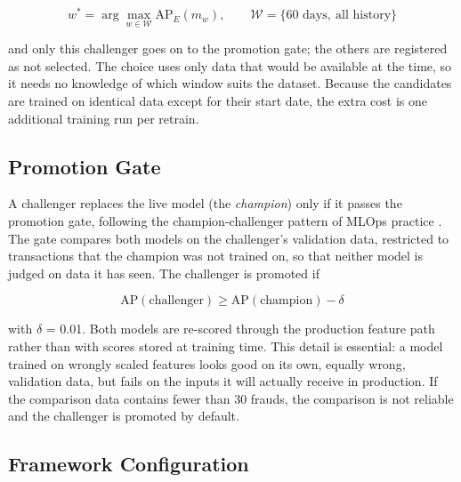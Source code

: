 \begin{equation}
  w^{*} = \arg\max_{w \in \mathcal{W}} \mathrm{AP}_{E}(m_w), \qquad \mathcal{W} = \{\text{60 days},\ \text{all history}\}
  \label{eq:select}
\end{equation}

and only this challenger goes on to the promotion gate; the others are registered as not selected. The choice uses only data that would be available at the time, so it needs no knowledge of which window suits the dataset. Because the candidates are trained on identical data except for their start date, the extra cost is one additional training run per retrain.

\subsection{Promotion Gate}\label{sec:gate}

A challenger replaces the live model (the \textit{champion}) only if it passes the promotion gate, following the champion-challenger pattern of MLOps practice \cite{pulicharla2019,kodakandla2024}. The gate compares both models on the challenger's validation data, restricted to transactions that the champion was not trained on, so that neither model is judged on data it has seen. The challenger is promoted if

\begin{equation}
  \mathrm{AP}(\text{challenger}) \ge \mathrm{AP}(\text{champion}) - \delta
  \label{eq:gate}
\end{equation}

with $\delta$ = 0.01. Both models are re-scored through the production feature path rather than with scores stored at training time. This detail is essential: a model trained on wrongly scaled features looks good on its own, equally wrong, validation data, but fails on the inputs it will actually receive in production. If the comparison data contains fewer than 30 frauds, the comparison is not reliable and the challenger is promoted by default.

\subsection{Framework Configuration}\label{sec:config}

